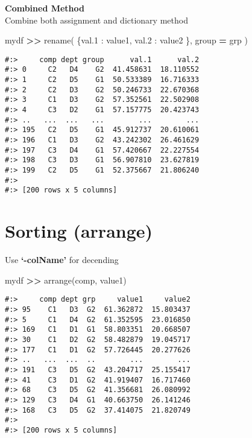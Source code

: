 \documentclass[
]{book}
\newenvironment{Shaded}{\begin{snugshade}}{\end{snugshade}}
\newcommand{\NormalTok}[1]{#1}
\newcommand{\OperatorTok}[1]{\textcolor[rgb]{0.43,0.43,0.43}{\textbf{#1}}}
\newcommand{\StringTok}[1]{\textcolor[rgb]{0.5,0.5,0.5}{#1}}
\begin{document}
\textbf{Combined Method}\\
Combine both assignment and dictionary method

\begin{Shaded}
\begin{Highlighting}[]
\NormalTok{mydf }\OperatorTok{\textgreater{}\textgreater{}}\NormalTok{ rename( \{}\StringTok{\textquotesingle{}val.1\textquotesingle{}}\NormalTok{ : }\StringTok{\textquotesingle{}value1\textquotesingle{}}\NormalTok{,}
                 \StringTok{\textquotesingle{}val.2\textquotesingle{}}\NormalTok{ : }\StringTok{\textquotesingle{}value2\textquotesingle{}}
\NormalTok{              \}, group }\OperatorTok{=} \StringTok{\textquotesingle{}grp\textquotesingle{}}\NormalTok{ )}
\end{Highlighting}
\end{Shaded}

\begin{verbatim}
#:>     comp dept group      val.1      val.2
#:> 0     C2   D4    G2  41.458631  18.110552
#:> 1     C2   D5    G1  50.533389  16.716333
#:> 2     C2   D3    G2  50.246733  22.670368
#:> 3     C1   D3    G2  57.352561  22.502908
#:> 4     C3   D2    G1  57.157775  20.423743
#:> ..   ...  ...   ...        ...        ...
#:> 195   C2   D5    G1  45.912737  20.610061
#:> 196   C1   D3    G2  43.242302  26.461629
#:> 197   C3   D4    G1  57.420667  22.227554
#:> 198   C3   D3    G1  56.907810  23.627819
#:> 199   C2   D5    G1  52.375667  21.806240
#:> 
#:> [200 rows x 5 columns]
\end{verbatim}

\hypertarget{sorting-arrange}{%
\section{Sorting (arrange)}\label{sorting-arrange}}

Use \textbf{`-colName'} for decending

\begin{Shaded}
\begin{Highlighting}[]
\NormalTok{mydf }\OperatorTok{\textgreater{}\textgreater{}}\NormalTok{ arrange(}\StringTok{\textquotesingle{}comp\textquotesingle{}}\NormalTok{, }\StringTok{\textquotesingle{}{-}value1\textquotesingle{}}\NormalTok{)}
\end{Highlighting}
\end{Shaded}

\begin{verbatim}
#:>     comp dept grp     value1     value2
#:> 95    C1   D3  G2  61.362872  15.803437
#:> 5     C1   D4  G2  61.352595  23.016850
#:> 169   C1   D1  G1  58.803351  20.668507
#:> 30    C1   D2  G2  58.482879  19.045717
#:> 177   C1   D1  G2  57.726445  20.277626
#:> ..   ...  ...  ..        ...        ...
#:> 191   C3   D5  G2  43.204717  25.155417
#:> 41    C3   D1  G2  41.919407  16.717460
#:> 68    C3   D5  G2  41.356681  26.080992
#:> 129   C3   D4  G1  40.663750  26.141246
#:> 168   C3   D5  G2  37.414075  21.820749
#:> 
#:> [200 rows x 5 columns]
\end{verbatim}
\end{document}
